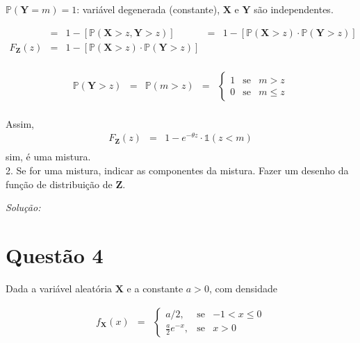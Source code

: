 \documentclass[a4paper, 11pt]{article}
\begin{document}
$\mathds{P}(\mathbf{Y}=m) = 1$: variável degenerada (constante), $\mathbf{X}$ e $\mathbf{Y}$ são independentes.

\begin{equation*}
\begin{array}{rclll}
& = & 1 - [\mathds{P}(\mathbf{X} > z, \mathbf{Y}>z)] & = & 1 - [\mathds{P}(\mathbf{X} > z)\cdot\mathds{P}(\mathbf{Y}>z)] \\[15pt]

F_{\mathbf{Z}}(z) & = & 1 - [\mathds{P}(\mathbf{X} > z)\cdot\mathds{P}(\mathbf{Y}>z)] \\[15pt]

\end{array}
\end{equation*}
 
\begin{equation*}
\begin{array}{lcllllll}
\mathds{P}(\mathbf{Y} > z) & = & \mathds{P}(m > z) & = & \left\{
    \begin{array}{rrlc}
         1 & \mbox{se} & m > z \\
         0 & \mbox{se} & m \leq z
    \end{array}
\right. \\[15pt]
\end{array}
\end{equation*}

Assim,
\begin{equation*}
\begin{array}{rclll}
F_{\mathbf{Z}}(z) & = & 1 - e^{-\theta z}\cdot\mathds{1}(z < m)  \\[15pt]

\end{array}
\end{equation*}
\noindent
sim, é uma mistura.\\
 
2. Se for uma mistura, indicar as componentes da mistura. Fazer um desenho da função de distribuição de $\mathbf{Z}$.

\noindent
\textit{Solução:} \\


\section*{Questão 4}

Dada a variável aleatória $\mathbf{X}$ e a constante $a>0$, com densidade 

\begin{equation*}
\begin{array}{lcllllll}
f_{\mathbf{X}}(x) & = & \left\{
    \begin{array}{rrlc}
         a/2, & \mbox{se} & -1 < x \leq 0\\
         \frac{a}{2}e^{-x}, & \mbox{se} & x>0
    \end{array}
\right. \\
\end{array}
\end{equation*}
\end{document}
